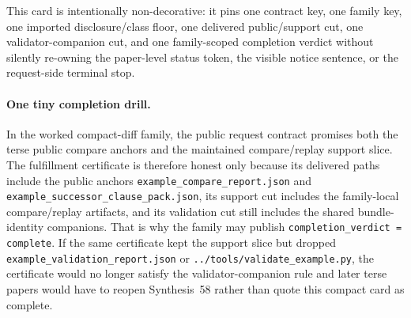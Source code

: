 \documentclass[11pt]{article}
\begin{document}
This card is intentionally non-decorative: it pins one contract key, one family key, one imported disclosure/class floor, one delivered public/support cut, one validator-companion cut, and one family-scoped completion verdict without silently re-owning the paper-level status token, the visible notice sentence, or the request-side terminal stop.\cite{series:workedexample}

\paragraph{One tiny completion drill.}
In the worked compact-diff family, the public request contract promises both the terse public compare anchors and the maintained compare/replay support slice. The fulfillment certificate is therefore honest only because its delivered paths include the public anchors \texttt{example\_compare\_report.json} and \texttt{example\_successor\_clause\_pack.json}, its support cut includes the family-local compare/replay artifacts, and its validation cut still includes the shared bundle-identity companions. That is why the family may publish \texttt{completion\_verdict = complete}. If the same certificate kept the support slice but dropped \texttt{example\_validation\_report.json} or \nolinkurl{../tools/validate_example.py}, the certificate would no longer satisfy the validator-companion rule and later terse papers would have to reopen Synthesis~58 rather than quote this compact card as complete.\cite{series:workedexample}
\end{document}
